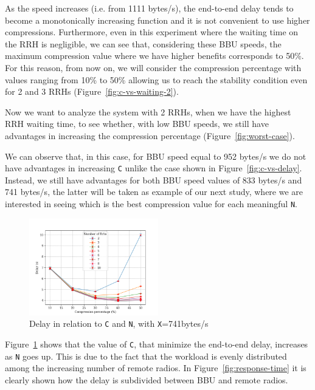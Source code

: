 \documentclass[11pt,a4paper,oneside, openright]{article}
\begin{document}
As the speed increases (i.e. from 1111 bytes/s), the end-to-end delay tends to become a monotonically increasing function and it is not convenient to use higher compressions. Furthermore, even in this experiment where the waiting time on the RRH is negligible, we can see that, considering these BBU speeds, the maximum compression value where we have higher benefits corresponds to 50\%. For this reason, from now on, we will consider the compression percentage with values ranging from 10\% to 50\% allowing us to reach the stability condition even for 2 and 3 RRHs (Figure~\ref{fig:c-vs-waiting-2}).

Now we want to analyze the system with 2 RRHs, when we have the highest RRH waiting time, to see whether, with low BBU speeds, we still have advantages in increasing the compression percentage (Figure~\ref{fig:worst-case}).

We can observe that, in this case, for BBU speed equal to 952 bytes/s we do not have advantages in increasing \texttt{C} unlike the case shown in Figure~\ref{fig:c-vs-delay}. Instead, we still have advantages for both BBU speed values of 833 bytes/s and 741 bytes/s, the latter will be taken as example of our next study, where we are interested in seeing which is the best compression value for each meaningful \texttt{N}.

\begin{figure}[h]
\centering
  \centering
  \includegraphics[width=0.5\textwidth]{images/c-vs-delay-741}
  \caption{Delay in relation to \texttt{C} and \texttt{N}, with \texttt{X}=741bytes/s}
  \label{fig:c-vs-delay-741}
\end{figure}


Figure~\ref{fig:c-vs-delay-741} shows that the value of \texttt{C}, that minimize the end-to-end delay, increases as \texttt{N} goes up. This is due to the fact that the workload is evenly distributed among the increasing number of remote radios. In Figure~\ref{fig:response-time} it is clearly shown how the delay is subdivided between BBU and remote radios.
\end{document}
